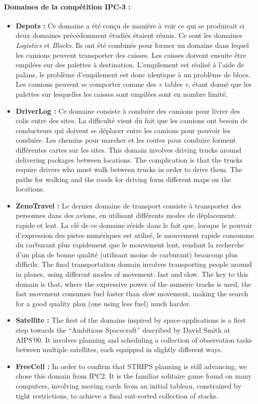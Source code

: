 \paragraph*{Domaines de la compétition IPC-3 :}
\begin{itemize}
\item \textbf{Depots :}
Ce domaine a été conçu de manière à voir ce qui se produirait si deux domaines précédemment étudiés étaient réunis. Ce sont les domaines \textit{Logistics} et \textit{Blocks}. Ils ont été combinés pour former un domaine dans lequel les camions peuvent transporter des caisses. Les caisses doivent ensuite être empilées sur des palettes à destination. L'empilement est réalisé à l'aide de palans, le problème d'empilement est donc identique à un problème de blocs. Les camions peuvent se comporter comme des « tables », étant donné que les palettes sur lesquelles les caisses sont empilées sont en nombre limité.
\item \textbf{DriverLog :}
Ce domaine consiste à conduire des camions pour livrer des colis entre des sites. La difficulté vient du fait que les camions ont besoin de conducteurs qui doivent se déplacer entre les camions pour pouvoir les conduire. Les chemins pour marcher et les routes pour conduire forment différentes cartes sur les sites.
{\color{red}This domain involves driving trucks around delivering packages between locations. The complication is that the trucks require drivers who must walk between trucks in order to drive them. The paths for walking and the roads for driving form different maps on the locations.}
\item \textbf{ZenoTravel :}
Le dernier domaine de transport consiste à transporter des personnes dans des avions, en utilisant différents modes de déplacement: rapide et lent. La clé de ce domaine réside dans le fait que, lorsque le pouvoir d’expression des pistes numériques est utilisé, le mouvement rapide consomme du carburant plus rapidement que le mouvement lent, rendant la recherche d’un plan de bonne qualité (utilisant moins de carburant) beaucoup plus difficile.
{\color{red}The final transportation domain involves transporting people around in planes, using different modes of movement: fast and slow. The key to this domain is that, where the expressive power of the numeric tracks is used, the fast movement consumes fuel faster than slow movement, making the search for a good quality plan (one using less fuel) much harder.}
\item \textbf{Satellite :}
{\color{red}The first of the domains inspired by space-applications is a first step towards the \enquote{Ambitious Spacecraft} described by David Smith at AIPS'00. It involves planning and scheduling a collection of observation tasks between multiple satellites, each equipped in slightly different ways.}
\item \textbf{FreeCell :}
{\color{red}In order to confirm that STRIPS planning is still advancing, we chose this domain from IPC2. It is the familiar solitaire game found on many computers, involving moving cards from an initial tableau, constrained by tight restrictions, to achieve a final suit-sorted collection of stacks.}
\end{itemize}

